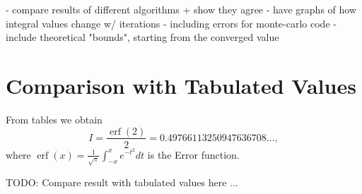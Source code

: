 \documentclass[10pt, a4paper]{article}
\begin{document}
- compare results of different algorithms + show they agree
- have graphs of how integral values change w/ iterations
  - including errors for monte-carlo code
  - include theoretical "bounds", starting from the converged value

{}


\appendix{}

\section{Comparison with Tabulated Values}
\label{app:cheat}
From tables we obtain
\begin{equation}
I = \frac{\operatorname{erf}(2)}{2} = 0.49766113250947636708 \dots,
\end{equation}
where $\operatorname{erf}(x) = \frac{1}{\sqrt\pi}\int_{-x}^x e^{-t^2} dt$ is the Error function.

TODO: Compare result with tabulated values here ...
\end{document}
